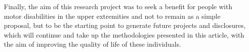 \documentclass[11pt]{report} %
\begin{document}
Finally, the aim of this research project was to seek a benefit for people with motor disabilities in the upper extremities and not to remain as a simple proposal, but to be the starting point to generate future projects and disclosures, which will continue and take up the methodologies presented in this article, with the aim of improving the quality of life of these individuals.\\



\begin{sloppypar}
    
    
\end{sloppypar}
\end{document}
